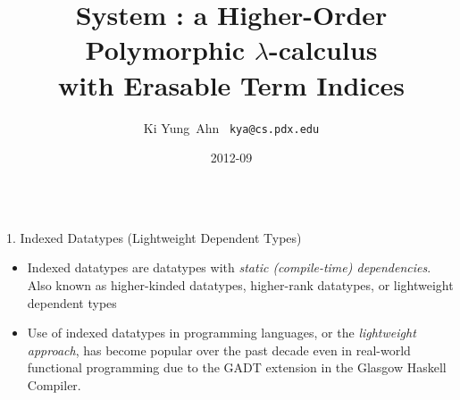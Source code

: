 \documentclass[final]{beamer}
\title[Fancy Posters]{{\VERYHuge System \Fi} {\Huge :}
		{\huge a Higher-Order Polymorphic $\lambda$-calculus} \\
		{\huge with Erasable Term Indices}
  }
\author[Ki Yung Ahn]{ Ki Yung $\,$Ahn $\,$ {\Large\texttt{kya@cs.pdx.edu}} }
\institute[Portland State University]{
	Department of Computer Science, Portland State University }
\date{2012-09}
\begin{document}
\begin{frame}[fragile]
\begin{columns}[t]

\begin{column}{.315\linewidth}

\begin{block}{1. Indexed Datatypes
	{\normalsize(Lightweight Dependent Types)} }
\begin{itemize}
\item Indexed datatypes are datatypes
	with \emph{static (compile-time) dependencies}.
	Also known as higher-kinded datatypes, higher-rank datatypes,
	or lightweight dependent types
\item Use of indexed datatypes in programming languages,
	or the {\emph{lightweight approach}}, has become popular
	over the past decade even in real-world functional programming due to
	the GADT extension in the Glasgow Haskell Compiler.
\end{itemize}
\end{block}


\end{column}
\end{columns}
\end{frame}
\end{document}
